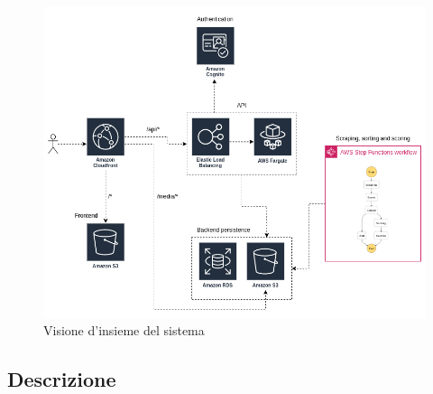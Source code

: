 \begin{figure}[!h]
    \includegraphics[width=16cm]{sezioni/images/overview.png}
    \centering
    \caption{Visione d'insieme del sistema}
\end{figure}

\subsection{Descrizione}
